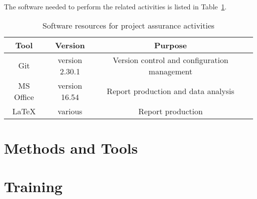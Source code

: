 The software needed to perform the related activities is listed in Table~\ref{table:software_resources}.

\begin{table}[H]
\centering
\begin{tabular}{||c|c|c|c||}
 \hline
 \textbf{Tool} & \textbf{Version} & \textbf{Purpose}\\
 \hline
 Git & version 2.30.1 & Version control and configuration management \\
 MS Office & version 16.54 & Report production and data analysis \\
 LaTeX & various & Report production \\
 \hline
\end{tabular}
\caption{Software resources for project assurance activities}
\label{table:software_resources}
\end{table}

\section{Methods and Tools}


\section{Training}

